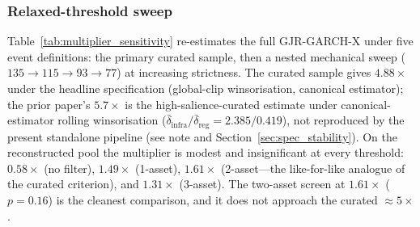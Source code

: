 \documentclass[pdflatex,sn-mathphys-num]{sn-jnl}
\theoremstyle{thmstyleone}
\theoremstyle{thmstyletwo}
\theoremstyle{thmstylethree}
\begin{document}
\subsubsection{Relaxed-threshold sweep}

Table~\ref{tab:multiplier_sensitivity} re-estimates the full GJR-GARCH-X under five event definitions: the primary curated sample, then a nested mechanical sweep ($135\rightarrow 115\rightarrow 93\rightarrow 77$) at increasing strictness. The curated sample gives $4.88\times$ under the headline specification (global-clip winsorisation, canonical estimator); the prior paper's $5.7\times$ is the high-salience-curated estimate under canonical-estimator rolling winsorisation ($\bar\delta_{\text{infra}}/\bar\delta_{\text{reg}}=2.385/0.419$), not reproduced by the present standalone pipeline (see note and Section~\ref{sec:spec_stability}). On the reconstructed pool the multiplier is modest and insignificant at every threshold: $0.58\times$ (no filter), $1.49\times$ (1-asset), $1.61\times$ (2-asset---the like-for-like analogue of the curated criterion), and $1.31\times$ (3-asset). The two-asset screen at $1.61\times$ ($p=0.16$) is the cleanest comparison, and it does not approach the curated $\approx 5\times$.
\end{document}
